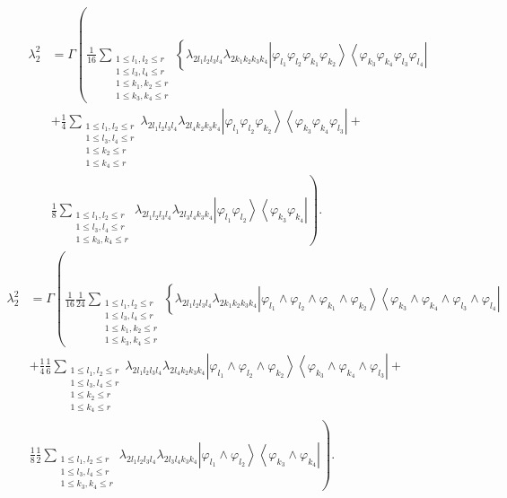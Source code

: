 \documentclass[aps,preprint]{revtex4}%
\begin{document}
\begin{align}
\lambda_{2}^{2}  &  =\Gamma\left(  \frac{1}{16}\sum_{\substack{1\leq
l_{1},l_{2}\leq r\\1\leq l_{3},l_{4}\leq r\\1\leq k_{1},k_{2}\leq r\\1\leq
k_{3},k_{4}\leq r}}\left\{  \lambda_{2l_{1}l_{2}l_{3}l_{4}}\lambda
_{2k_{1}k_{2}k_{3}k_{4}}\left\vert \varphi_{l_{1}}\varphi_{l_{2}}%
\varphi_{k_{1}}\varphi_{k_{2}}\right\rangle \left\langle \varphi_{k_{3}%
}\varphi_{k_{4}}\varphi_{l_{3}}\varphi_{l_{4}}\right\vert \right.  \right.
\nonumber\\
&  +\frac{1}{4}\sum_{\substack{1\leq l_{1},l_{2}\leq r\\1\leq l_{3},l_{4}\leq
r\\1\leq k_{2}\leq r\\1\leq k_{4}\leq r}}\lambda_{2l_{1}l_{2}l_{3}l_{4}%
}\lambda_{2l_{4}k_{2}k_{3}k_{4}}\left\vert \varphi_{l_{1}}\varphi_{l_{2}%
}\varphi_{k_{2}}\right\rangle \left\langle \varphi_{k_{3}}\varphi_{k_{4}%
}\varphi_{l_{3}}\right\vert +\nonumber\\
&  \left.  \frac{1}{8}\sum_{\substack{1\leq l_{1},l_{2}\leq r\\1\leq
l_{3},l_{4}\leq r\\1\leq k_{3},k_{4}\leq r}}\lambda_{2l_{1}l_{2}l_{3}l_{4}%
}\lambda_{2l_{3}l_{4}k_{3}k_{4}}\left\vert \varphi_{l_{1}}\varphi_{l_{2}%
}\right\rangle \left\langle \varphi_{k_{3}}\varphi_{k_{4}}\right\vert \right)
.
\end{align}%
\begin{align}
\lambda_{2}^{2}  &  =\Gamma\left(  \frac{1}{16}\frac{1}{24}\sum
_{\substack{1\leq l_{1},l_{2}\leq r\\1\leq l_{3},l_{4}\leq r\\1\leq
k_{1},k_{2}\leq r\\1\leq k_{3},k_{4}\leq r}}\left\{  \lambda_{2l_{1}l_{2}%
l_{3}l_{4}}\lambda_{2k_{1}k_{2}k_{3}k_{4}}\left\vert \varphi_{l_{1}}%
\wedge\varphi_{l_{2}}\wedge\varphi_{k_{1}}\wedge\varphi_{k_{2}}\right\rangle
\left\langle \varphi_{k_{3}}\wedge\varphi_{k_{4}}\wedge\varphi_{l_{3}}%
\wedge\varphi_{l_{4}}\right\vert \right.  \right. \nonumber\\
&  +\frac{1}{4}\frac{1}{6}\sum_{\substack{1\leq l_{1},l_{2}\leq r\\1\leq
l_{3},l_{4}\leq r\\1\leq k_{2}\leq r\\1\leq k_{4}\leq r}}\lambda_{2l_{1}%
l_{2}l_{3}l_{4}}\lambda_{2l_{4}k_{2}k_{3}k_{4}}\left\vert \varphi_{l_{1}%
}\wedge\varphi_{l_{2}}\wedge\varphi_{k_{2}}\right\rangle \left\langle
\varphi_{k_{3}}\wedge\varphi_{k_{4}}\wedge\varphi_{l_{3}}\right\vert
+\nonumber\\
&  \left.  \frac{1}{8}\frac{1}{2}\sum_{\substack{1\leq l_{1},l_{2}\leq
r\\1\leq l_{3},l_{4}\leq r\\1\leq k_{3},k_{4}\leq r}}\lambda_{2l_{1}l_{2}%
l_{3}l_{4}}\lambda_{2l_{3}l_{4}k_{3}k_{4}}\left\vert \varphi_{l_{1}}%
\wedge\varphi_{l_{2}}\right\rangle \left\langle \varphi_{k_{3}}\wedge
\varphi_{k_{4}}\right\vert \right)  .
\end{align}%
\end{document}
